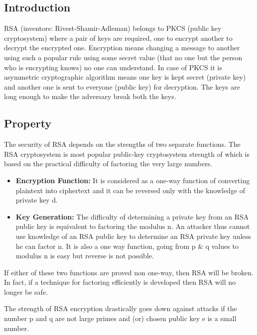 \subsection{Introduction}
RSA (inventors: Rivest-Shamir-Adleman) belongs to PKCS (public key cryptosystem) where a pair of keys are required, one to encrypt another to decrypt the encrypted one. Encryption means changing a message to another using such a popular rule using some secret value (that no one but the person who is encrypting knows) no one can understand. In case of PKCS it is asymmetric cryptographic algorithm means one key is kept secret (private key) and another one is sent to everyone (public key) for decryption. The keys are long enough to make the adversary break both the keys.

\subsection{Property}
The security of RSA depends on the strengths of two separate functions. The RSA cryptosystem is most popular public-key cryptosystem strength of which is based on the practical difficulty of factoring the very large numbers.

\begin{itemize}
\item \textbf{Encryption Function:} It is considered as a one-way function of converting plaintext into ciphertext and it can be reversed only with the knowledge of private key d.
\item \textbf{Key Generation:} The difficulty of determining a private key from an RSA public key is equivalent to factoring the modulus n. An attacker thus cannot use knowledge of an RSA public key to determine an RSA private key unless he can factor n. It is also a one way function, going from p \& q values to modulus n is easy but reverse is not possible.
\end{itemize}

If either of these two functions are proved non one-way, then RSA will be broken. In fact, if a technique for factoring efficiently is developed then RSA will no longer be safe.

The strength of RSA encryption drastically goes down against attacks if the number p and q are not large primes and (or) chosen public key e is a small number.

